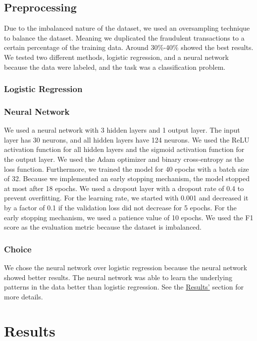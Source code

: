 \documentclass[a4, 10 pt, conference]{ieeeconf}  %
\begin{document}
\subsection{Preprocessing}
\label{sec:preprocess}
Due to the imbalanced nature of the dataset, we used an oversampling technique to balance the dataset. Meaning we duplicated the fraudulent transactions to a certain percentage of the training data. Around 30\%-40\% showed the best results.
We tested two different methods, logistic regression, and a neural network because the data were labeled, and the task was a classification problem.
\subsubsection{Logistic Regression}

\subsubsection{Neural Network}
We used a neural network with 3 hidden layers and 1 output layer. The input layer has 30 neurons, and all hidden layers have 124 neurons. We used the ReLU activation function for all hidden layers and the sigmoid activation function for the output layer. We used the Adam optimizer and binary cross-entropy as the loss function. Furthermore, we trained the
model for 40 epochs with a batch size of 32. Because we implemented an early stopping mechanism, the model stopped at most after 18 epochs. We used a dropout layer with a dropout rate of 0.4 to prevent overfitting. For the learning rate, we started with 0.001 and decreased it by a factor of 0.1 if the validation loss did not decrease for 5 epochs.
For the early stopping mechanism, we used a patience value of 10 epochs. We used the F1 score as the evaluation metric because the dataset is imbalanced.

\subsubsection{Choice}
We chose the neural network over logistic regression because the neural network showed better results. The neural network was able to learn the underlying patterns in the data better than logistic regression.
See the \hyperref[sec:results]{Results'} section for more details.

\section{Results}
\label{sec:results}
\end{document}

